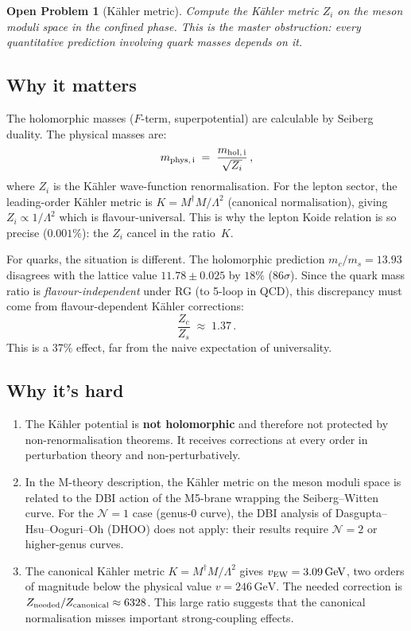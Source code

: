 \documentclass[12pt,a4paper]{article}
\newcommand{\GeV}{\,\mathrm{GeV}}
\newtheorem{problem}{Open Problem}
\begin{document}
\begin{problem}[K\"ahler metric]
Compute the K\"ahler metric $Z_i$ on the meson moduli space in the
confined phase.  This is the master obstruction: every quantitative
prediction involving quark masses depends on it.
\end{problem}

\subsection{Why it matters}

The holomorphic masses ($F$-term, superpotential) are calculable by
Seiberg duality.  The physical masses are:
\begin{equation}
  m_{\rm phys,\,i} \;=\; \frac{m_{\rm hol,\,i}}{\sqrt{Z_i}}\,,
\end{equation}
where $Z_i$ is the K\"ahler wave-function renormalisation.  For the
lepton sector, the leading-order K\"ahler metric is
$K = M^\dagger M / \Lambda^2$ (canonical normalisation), giving
$Z_i \propto 1/\Lambda^2$ which is flavour-universal.  This is why
the lepton Koide relation is so precise ($0.001\%$): the $Z_i$ cancel
in the ratio~$K$.

For quarks, the situation is different.  The holomorphic prediction
$m_c/m_s = 13.93$ disagrees with the lattice value $11.78 \pm 0.025$
by $18\%$ (86$\sigma$).  Since the quark mass ratio is
\emph{flavour-independent} under RG (to 5-loop in QCD), this
discrepancy must come from flavour-dependent K\"ahler corrections:
\begin{equation}
  \frac{Z_c}{Z_s} \;\approx\; 1.37\,.
\end{equation}
This is a 37\% effect, far from the naive expectation of universality.

\subsection{Why it's hard}

\begin{enumerate}
\item The K\"ahler potential is \textbf{not holomorphic} and therefore
  not protected by non-renormalisation theorems.  It receives corrections
  at every order in perturbation theory and non-perturbatively.

\item In the M-theory description, the K\"ahler metric on the meson
  moduli space is related to the DBI action of the M5-brane wrapping
  the Seiberg--Witten curve.  For the $\mathcal{N}{=}1$ case (genus-0
  curve), the DBI analysis of Dasgupta--Hsu--Ooguri--Oh (DHOO) does
  not apply: their results require $\mathcal{N}{=}2$ or higher-genus
  curves.

\item The canonical K\"ahler metric $K = M^\dagger M / \Lambda^2$ gives
  $v_{\rm EW} = 3.09\GeV$, two orders of magnitude below the physical
  value $v = 246\GeV$.  The needed correction is
  $Z_{\rm needed}/Z_{\rm canonical} \approx 6328$.
  This large ratio suggests that the canonical normalisation misses
  important strong-coupling effects.
\end{enumerate}
\end{document}
